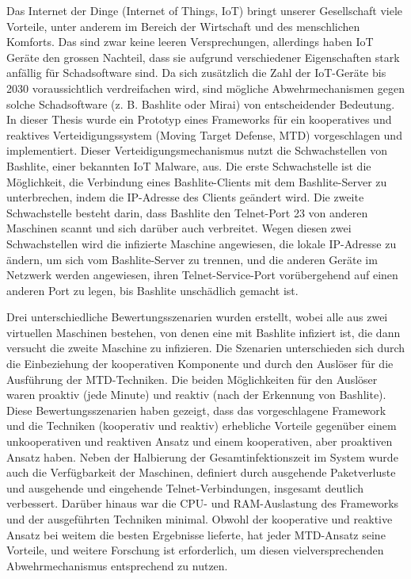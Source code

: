 \clearpage
{}
Das Internet der Dinge (Internet of Things, IoT) bringt unserer Gesellschaft viele Vorteile, unter anderem im Bereich der Wirtschaft und des menschlichen Komforts. Das sind zwar keine leeren Versprechungen, allerdings haben IoT Geräte den grossen Nachteil, dass sie aufgrund verschiedener Eigenschaften stark anfällig für Schadsoftware sind. Da sich zusätzlich die Zahl der IoT-Geräte bis 2030 voraussichtlich verdreifachen wird, sind mögliche Abwehrmechanismen gegen solche Schadsoftware (z. B. Bashlite oder Mirai) von entscheidender Bedeutung. In dieser Thesis wurde ein Prototyp eines Frameworks für ein kooperatives und reaktives Verteidigungssystem (Moving Target Defense, MTD) vorgeschlagen und implementiert. Dieser Verteidigungsmechanismus nutzt die Schwachstellen von Bashlite, einer bekannten IoT Malware, aus. Die erste Schwachstelle ist die Möglichkeit, die Verbindung eines Bashlite-Clients mit dem Bashlite-Server zu unterbrechen, indem die IP-Adresse des Clients geändert wird. Die zweite Schwachstelle besteht darin, dass Bashlite den Telnet-Port 23 von anderen Maschinen scannt und sich darüber auch verbreitet. Wegen diesen zwei Schwachstellen wird die infizierte Maschine angewiesen, die lokale IP-Adresse zu ändern, um sich vom Bashlite-Server zu trennen, und die anderen Geräte im Netzwerk werden angewiesen, ihren Telnet-Service-Port vorübergehend auf einen anderen Port zu legen, bis Bashlite unschädlich gemacht ist.

Drei unterschiedliche Bewertungsszenarien wurden erstellt, wobei alle aus zwei virtuellen Maschinen bestehen, von denen eine mit Bashlite infiziert ist, die dann versucht die zweite Maschine zu infizieren. Die Szenarien unterschieden sich durch die Einbeziehung der kooperativen Komponente und durch den Auslöser für die Ausführung der MTD-Techniken. Die beiden Möglichkeiten für den Auslöser waren proaktiv (jede Minute) und reaktiv (nach der Erkennung von Bashlite). Diese Bewertungsszenarien haben gezeigt, dass das vorgeschlagene Framework und die Techniken (kooperativ und reaktiv) erhebliche Vorteile gegenüber einem unkooperativen und reaktiven Ansatz und einem kooperativen, aber proaktiven Ansatz haben. Neben der Halbierung der Gesamtinfektionszeit im System wurde auch die Verfügbarkeit der Maschinen, definiert durch ausgehende Paketverluste und ausgehende und eingehende Telnet-Verbindungen, insgesamt deutlich verbessert. Darüber hinaus war die CPU- und RAM-Auslastung des Frameworks und der ausgeführten Techniken minimal. Obwohl der kooperative und reaktive Ansatz bei weitem die besten Ergebnisse lieferte, hat jeder MTD-Ansatz seine Vorteile, und weitere Forschung ist erforderlich, um diesen vielversprechenden Abwehrmechanismus entsprechend zu nutzen.







